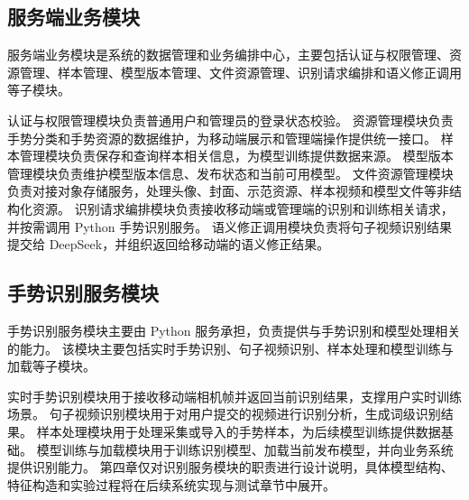 \subsection{服务端业务模块}

服务端业务模块是系统的数据管理和业务编排中心，主要包括认证与权限管理、资源管理、样本管理、模型版本管理、文件资源管理、识别请求编排和语义修正调用等子模块。

认证与权限管理模块负责普通用户和管理员的登录状态校验。
资源管理模块负责手势分类和手势资源的数据维护，为移动端展示和管理端操作提供统一接口。
样本管理模块负责保存和查询样本相关信息，为模型训练提供数据来源。
模型版本管理模块负责维护模型版本信息、发布状态和当前可用模型。
文件资源管理模块负责对接对象存储服务，处理头像、封面、示范资源、样本视频和模型文件等非结构化资源。
识别请求编排模块负责接收移动端或管理端的识别和训练相关请求，并按需调用 Python 手势识别服务。
语义修正调用模块负责将句子视频识别结果提交给 DeepSeek，并组织返回给移动端的语义修正结果。

\subsection{手势识别服务模块}

手势识别服务模块主要由 Python 服务承担，负责提供与手势识别和模型处理相关的能力。
该模块主要包括实时手势识别、句子视频识别、样本处理和模型训练与加载等子模块。

实时手势识别模块用于接收移动端相机帧并返回当前识别结果，支撑用户实时训练场景。
句子视频识别模块用于对用户提交的视频进行识别分析，生成词级识别结果。
样本处理模块用于处理采集或导入的手势样本，为后续模型训练提供数据基础。
模型训练与加载模块用于训练识别模型、加载当前发布模型，并向业务系统提供识别能力。
第四章仅对识别服务模块的职责进行设计说明，具体模型结构、特征构造和实验过程将在后续系统实现与测试章节中展开。
